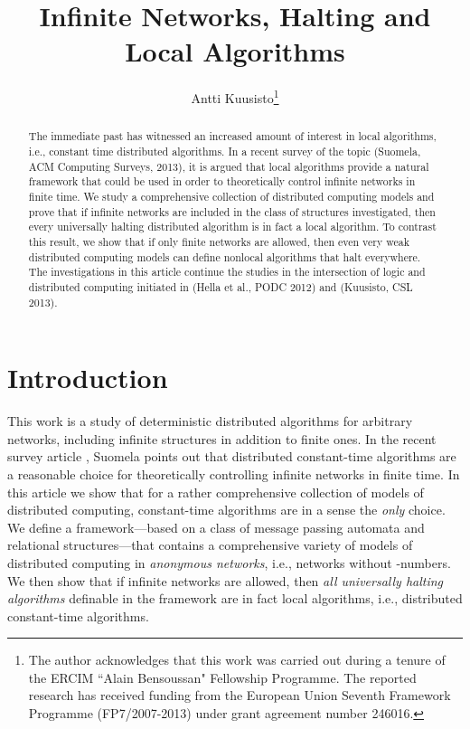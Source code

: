 \documentclass[copyright,creativecommons]{eptcs}
\title{Infinite Networks, Halting and Local Algorithms}
\author{Antti Kuusisto\thanks{The author acknowledges that
this work was carried out during a tenure of the
ERCIM ``Alain
Bensoussan" Fellowship Programme.
The reported research has received funding from the
European Union
Seventh Framework
Programme (FP7/2007-2013) under
grant agreement
number 246016.}
\institute{Institute of Computer Science\\ University of Wroc\l aw\\ Poland}
\email{antti.j.kuusisto@uta.fi}
}
\begin{document}
\maketitle

\begin{abstract}
The immediate past has witnessed an increased amount of interest in local algorithms, i.e., constant time distributed algorithms. In a recent survey of the topic (Suomela, ACM Computing Surveys, 2013), it is argued that local algorithms provide a natural framework that could be used in order to theoretically control infinite networks in finite time. We study a comprehensive collection of distributed computing models and prove that if infinite networks are included in the class of structures investigated, then every universally halting distributed algorithm is in fact a local algorithm. To contrast this result, we show that if only finite networks are allowed, then even very weak distributed computing models can define nonlocal algorithms that halt everywhere. The investigations in this article continue the studies in the intersection of logic and distributed computing initiated in (Hella et al., PODC 2012) and (Kuusisto, CSL 2013).




\end{abstract}

\section{Introduction}








This work is a study of deterministic distributed algorithms for arbitrary networks,
including infinite structures in addition to finite ones.
In the recent survey article \cite{suomela}, Suomela points out that distributed constant-time algorithms are a reasonable
choice for theoretically controlling infinite networks in finite time. In this article we show that for a rather comprehensive
collection of models of distributed computing, constant-time algorithms are in a
sense the \emph{only} choice. We define a
framework---based on a class of message passing automata and relational structures---that contains a
comprehensive variety of models of distributed computing in \emph{anonymous networks}, i.e., networks
without -numbers.
We then show that if infinite networks are allowed,
then \emph{all universally halting algorithms} definable in the framework are in fact local algorithms, i.e.,
distributed constant-time algorithms. 
\end{document}

